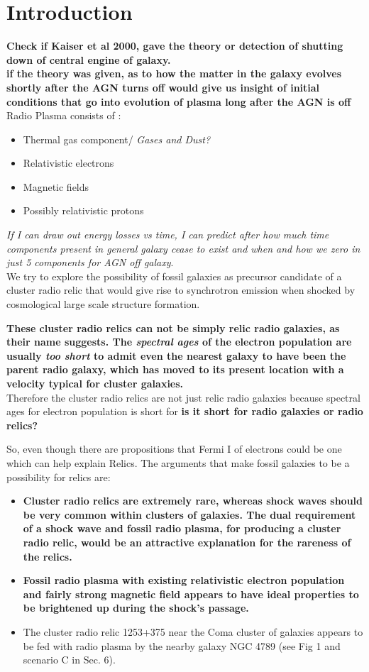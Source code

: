 \documentclass[12pt]{report}
\newcommand{\tbf}[1]{\textbf{#1}}
\newcommand{\tit}[1]{\textit{#1}}
\newcommand{\cbox}{tcolorbox}
\begin{document}
\section{Introduction}
\tbf{Check if Kaiser et al 2000, gave the theory or detection of shutting down of central engine of galaxy.}\\
\tbf{if the theory was given, as to how the matter in the galaxy evolves shortly after the AGN turns off would give us insight of initial conditions that go into evolution of plasma long after the AGN is off}\\
Radio Plasma consists of :
\begin{itemize}
\item Thermal gas component/ \tit{Gases and Dust?}
\item Relativistic electrons
\item Magnetic fields
\item Possibly relativistic protons
\end{itemize}
\tit{If I can draw out energy losses vs time, I can predict after how much time components present in general galaxy cease to exist and when and how we zero in just 5 components for AGN off galaxy}.\\
We try to explore the possibility of fossil galaxies as precursor candidate of a cluster radio relic that would give rise to synchrotron emission when shocked by cosmological large scale structure formation.
\begin{\cbox}
\textbf{ These cluster radio relics can not be simply relic radio galaxies, as their name suggests. The \tit{spectral ages} of the electron population are usually \tit{too short} to admit even the nearest galaxy to have been the parent radio galaxy, which has moved to its present location with a velocity typical for cluster galaxies.}\\
Therefore the cluster radio relics are not just relic radio galaxies because spectral ages for electron population is short for \tbf{is it short for radio galaxies or radio relics?}
\end{\cbox}
So, even though there are propositions that Fermi I of electrons could be one which can help explain Relics. The arguments that make fossil galaxies to be a possibility for relics are:
\begin{itemize}
\item \textbf{Cluster radio relics are extremely rare, whereas shock waves should be very common within clusters of galaxies. The dual requirement of a shock wave and fossil radio plasma, for producing a cluster radio relic, would be an attractive explanation for the rareness of the relics. }
\item \textbf{ Fossil radio plasma with existing relativistic electron population and fairly strong magnetic field appears to have ideal properties to be brightened up during the shock's passage. }
\item  The cluster radio relic 1253+375 near the Coma cluster of galaxies appears to be fed with radio plasma by the nearby galaxy NGC 4789 (see Fig 1 and scenario C in Sec. 6).
\end{itemize}
\end{document}
